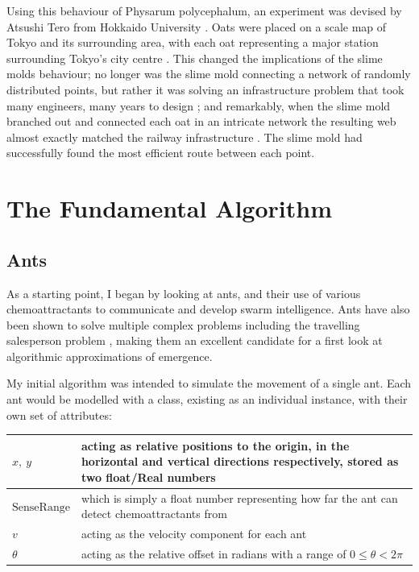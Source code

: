 \documentclass[]{report}
\begin{document}
Using this behaviour of \Gls{Physarum polycephalum}, an experiment was devised by Atsushi Tero from Hokkaido University \cite{jabr_how_2012}. Oats were placed on a scale map of Tokyo and its surrounding area, with each oat representing a major station surrounding Tokyo’s city centre \cite{bbc_earth_lab_can_2018}. This changed the implications of the slime molds behaviour; no longer was the slime mold connecting a network of randomly distributed points, but rather it was solving an infrastructure problem that took many engineers, many years to design \cite{bbc_earth_lab_can_2018, world_science_festival_what_2019}; and remarkably, when the slime mold branched out and connected each oat in an intricate network the resulting web almost exactly matched the railway infrastructure \cite{bbc_earth_lab_can_2018, jabr_how_2012}. The slime mold had successfully found the most efficient route between each point.

\section{The Fundamental Algorithm}
\subsection{Ants}
As a starting point, I began by looking at ants, and their use of various chemoattractants to communicate and develop swarm intelligence. Ants have also been shown to solve multiple complex problems including the travelling salesperson problem \cite{httpwwwardamiscom_emergent_2009}, making them an excellent candidate for a first look at algorithmic approximations of emergence. 

My initial algorithm was intended to simulate the movement of a single ant. Each ant would be modelled with a \gls{class}, existing as an individual instance, with their own set of attributes:

\begin{center}
\begin{tabular}{ | m{5em} | m{7cm}| } 
  \hline
  $x,\: y$& acting as relative positions to the origin, in the horizontal and vertical directions respectively, stored as two float/Real numbers \\
  \hline
  $\mathrm{SenseRange}$& which is simply a float number representing how far the ant can detect chemoattractants from \\ 
  \hline
  $v$ & acting as the velocity component for each ant \\ 
  \hline
  $\theta$ & acting as the relative offset in radians with a range of $0 \leq\theta<2\pi$ \\ 
  \hline
\end{tabular}
\end{center}
\end{document}
